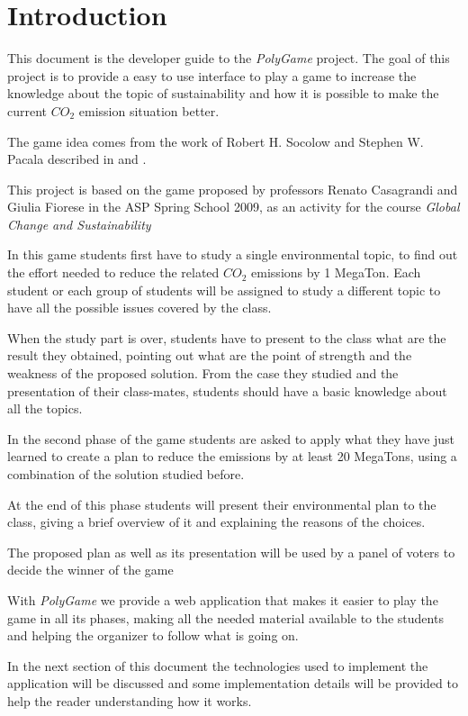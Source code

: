 \section{Introduction}
This document is the developer guide to the \emph{PolyGame} project. The goal of this project is to provide a easy to use interface to play a game to increase the knowledge about the topic of sustainability and how it is possible to make the current \emph{$CO_2$} emission situation better.


The game idea comes from the work of Robert H. Socolow and Stephen W. Pacala described in \cite{scientificAmerican} and \cite{science}.

This project is based on the game proposed by professors Renato Casagrandi and Giulia Fiorese in the ASP Spring School 2009, as an activity for the course \emph{Global Change and Sustainability}

In this game students first have to study a single environmental topic, to find out the effort needed to reduce the related \emph{$CO_2$} emissions by 1 MegaTon. Each student or each group of students will be assigned to study a different topic to have all the possible issues covered by the class.

When the study part is over, students have to present to the class what are the result they obtained, pointing out what are the point of strength and the weakness of the proposed solution. From  the case they studied and the presentation of their class-mates, students should have a basic knowledge about all the topics.

In the second phase of the game students are asked to apply what they have just learned to create a plan to reduce the emissions by at least 20 MegaTons, using a combination of the solution studied before.

At the end of this phase students will present their environmental plan to the class, giving a brief overview of it and explaining the reasons of the choices.

The proposed plan as well as its presentation will be used by a panel of voters to decide the winner of the game

With \emph{PolyGame} we provide a web application that makes it easier to play the game in all its phases, making all the needed material available to the students and helping the organizer to follow what is going on.

In the next section of this document the technologies used to implement the application will be discussed and some implementation details will be provided to help the reader understanding how it works.